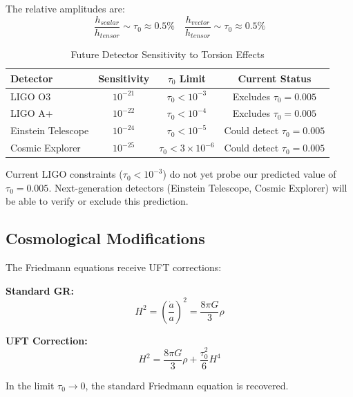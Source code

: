 The relative amplitudes are:
\begin{equation}
    \frac{h_{scalar}}{h_{tensor}} \sim \tau_0 \approx 0.5\%
    \quad
    \frac{h_{vector}}{h_{tensor}} \sim \tau_0 \approx 0.5\%
\end{equation}

\begin{table}[htbp]
\centering
\caption{Future Detector Sensitivity to Torsion Effects}
\begin{tabular}{@{}lccc@{}}
\toprule
Detector & Sensitivity & $\tau_0$ Limit & Current Status \\
\midrule
LIGO O3 & $10^{-21}$ & $\tau_0 < 10^{-3}$ & Excludes $\tau_0 = 0.005$ \\
LIGO A+ & $10^{-22}$ & $\tau_0 < 10^{-4}$ & Excludes $\tau_0 = 0.005$ \\
Einstein Telescope & $10^{-24}$ & $\tau_0 < 10^{-5}$ & Could detect $\tau_0 = 0.005$ \\
Cosmic Explorer & $10^{-25}$ & $\tau_0 < 3\times 10^{-6}$ & Could detect $\tau_0 = 0.005$ \\
\bottomrule
\end{tabular}
\label{tab:gw_detectors}
\end{table}

\begin{remark}
Current LIGO constraints ($\tau_0 < 10^{-3}$) do not yet probe our predicted value of $\tau_0 = 0.005$. Next-generation detectors (Einstein Telescope, Cosmic Explorer) will be able to verify or exclude this prediction.
\end{remark}

\subsection{Cosmological Modifications}

The Friedmann equations receive UFT corrections:

\textbf{Standard GR:}
\begin{equation}
    H^2 = \left(\frac{\dot{a}}{a}\right)^2 = \frac{8\pi G}{3}\rho
\end{equation}

\textbf{UFT Correction:}
\begin{equation}
    H^2 = \frac{8\pi G}{3}\rho + \frac{\tau_0^2}{6}H^4
    \label{eq:modified_friedmann}
\end{equation}

In the limit $\tau_0 \to 0$, the standard Friedmann equation is recovered.

